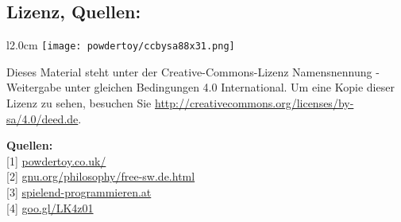 \subsection*{Lizenz, Quellen:}
\begin{wrapfigure}{l}{2.0cm}
\texttt{[image: powdertoy/ccbysa88x31.png]}
\end{wrapfigure}
Dieses Material steht unter der Creative-Commons-Lizenz Namensnennung - Weitergabe unter gleichen Bedingungen 4.0 International. Um eine Kopie dieser Lizenz zu sehen, besuchen Sie \url{http://creativecommons.org/licenses/by-sa/4.0/deed.de}.

\textbf{Quellen:} \\
{[}1{]} \href{http://powdertoy.co.uk/}{powdertoy.co.uk/} \\
{[}2{]} \href{http://www.gnu.org/philosophy/free-sw.de.html}{gnu.org/philosophy/free-sw.de.html} \\
{[}3{]} \href{http://spielend-programmieren.at}{spielend-programmieren.at} \\
{[}4{]} \href{http://goo.gl/LK4z01}{goo.gl/LK4z01} \\
